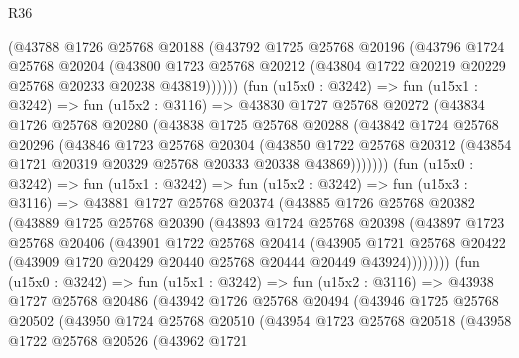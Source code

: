 \begin{lexlean}{R36}
\begin{coremodule}
          (@43788
            @1726
            @25768
            @20188
            (@43792
              @1725
              @25768
              @20196
              (@43796
                @1724
                @25768
                @20204
                (@43800
                  @1723
                  @25768
                  @20212
                  (@43804 @1722 @20219 @20229 @25768 @20233 @20238 @43819))))))
        (fun (u15x0 : @3242) =>
        fun (u15x1 : @3242) =>
        fun (u15x2 : @3116) =>
        @43830
          @1727
          @25768
          @20272
          (@43834
            @1726
            @25768
            @20280
            (@43838
              @1725
              @25768
              @20288
              (@43842
                @1724
                @25768
                @20296
                (@43846
                  @1723
                  @25768
                  @20304
                  (@43850
                    @1722
                    @25768
                    @20312
                    (@43854 @1721 @20319 @20329 @25768 @20333 @20338 @43869)))))))
        (fun (u15x0 : @3242) =>
        fun (u15x1 : @3242) =>
        fun (u15x2 : @3242) =>
        fun (u15x3 : @3116) =>
        @43881
          @1727
          @25768
          @20374
          (@43885
            @1726
            @25768
            @20382
            (@43889
              @1725
              @25768
              @20390
              (@43893
                @1724
                @25768
                @20398
                (@43897
                  @1723
                  @25768
                  @20406
                  (@43901
                    @1722
                    @25768
                    @20414
                    (@43905
                      @1721
                      @25768
                      @20422
                      (@43909 @1720 @20429 @20440 @25768 @20444 @20449 @43924))))))))
        (fun (u15x0 : @3242) =>
        fun (u15x1 : @3242) =>
        fun (u15x2 : @3116) =>
        @43938
          @1727
          @25768
          @20486
          (@43942
            @1726
            @25768
            @20494
            (@43946
              @1725
              @25768
              @20502
              (@43950
                @1724
                @25768
                @20510
                (@43954
                  @1723
                  @25768
                  @20518
                  (@43958
                    @1722
                    @25768
                    @20526
                    (@43962
                      @1721

\end{coremodule}
\end{lexlean}
